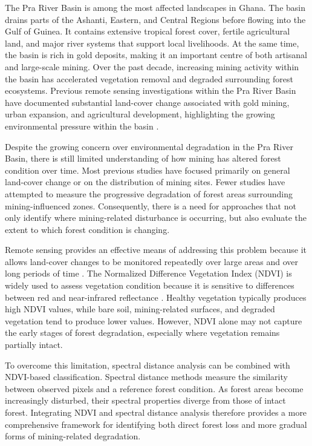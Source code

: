 \documentclass[a4paper,12pt]{report}
\begin{document}
The Pra River Basin is among the most affected landscapes in Ghana. The basin drains parts of the Ashanti, Eastern, and Central Regions before flowing into the Gulf of Guinea. It contains extensive tropical forest cover, fertile agricultural land, and major river systems that support local livelihoods. At the same time, the basin is rich in gold deposits, making it an important centre of both artisanal and large-scale mining. Over the past decade, increasing mining activity within the basin has accelerated vegetation removal and degraded surrounding forest ecosystems. Previous remote sensing investigations within the Pra River Basin have documented substantial land-cover change associated with gold mining, urban expansion, and agricultural development, highlighting the growing environmental pressure within the basin \citep{awotwi2018pra}.

Despite the growing concern over environmental degradation in the Pra River Basin, there is still limited understanding of how mining has altered forest condition over time. Most previous studies have focused primarily on general land-cover change or on the distribution of mining sites. Fewer studies have attempted to measure the progressive degradation of forest areas surrounding mining-influenced zones. Consequently, there is a need for approaches that not only identify where mining-related disturbance is occurring, but also evaluate the extent to which forest condition is changing.

Remote sensing provides an effective means of addressing this problem because it allows land-cover changes to be monitored repeatedly over large areas and over long periods of time \citep{lu2004change,singh1989review}. The Normalized Difference Vegetation Index (NDVI) is widely used to assess vegetation condition because it is sensitive to differences between red and near-infrared reflectance \citep{tucker1979ndvi}. Healthy vegetation typically produces high NDVI values, while bare soil, mining-related surfaces, and degraded vegetation tend to produce lower values. However, NDVI alone may not capture the early stages of forest degradation, especially where vegetation remains partially intact.

To overcome this limitation, spectral distance analysis can be combined with NDVI-based classification. Spectral distance methods measure the similarity between observed pixels and a reference forest condition. As forest areas become increasingly disturbed, their spectral properties diverge from those of intact forest. Integrating NDVI and spectral distance analysis therefore provides a more comprehensive framework for identifying both direct forest loss and more gradual forms of mining-related degradation.
\end{document}
